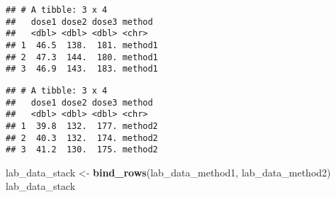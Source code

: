 \documentclass[]{book}
\newenvironment{Shaded}{\begin{snugshade}}{\end{snugshade}}
\newcommand{\CommentTok}[1]{\textcolor[rgb]{0.56,0.35,0.01}{\textit{#1}}}
\newcommand{\DataTypeTok}[1]{\textcolor[rgb]{0.13,0.29,0.53}{#1}}
\newcommand{\KeywordTok}[1]{\textcolor[rgb]{0.13,0.29,0.53}{\textbf{#1}}}
\newcommand{\NormalTok}[1]{#1}
\newcommand{\OperatorTok}[1]{\textcolor[rgb]{0.81,0.36,0.00}{\textbf{#1}}}
\newcommand{\StringTok}[1]{\textcolor[rgb]{0.31,0.60,0.02}{#1}}
\theoremstyle{definition}
\theoremstyle{definition}
\theoremstyle{definition}
\theoremstyle{remark}
\begin{document}
\begin{Shaded}
\end{Shaded}

\begin{verbatim}
## # A tibble: 3 x 4
##   dose1 dose2 dose3 method 
##   <dbl> <dbl> <dbl> <chr>  
## 1  46.5  138.  181. method1
## 2  47.3  144.  180. method1
## 3  46.9  143.  183. method1
\end{verbatim}

\begin{Shaded}
\end{Shaded}

\begin{verbatim}
## # A tibble: 3 x 4
##   dose1 dose2 dose3 method 
##   <dbl> <dbl> <dbl> <chr>  
## 1  39.8  132.  177. method2
## 2  40.3  132.  174. method2
## 3  41.2  130.  175. method2
\end{verbatim}

\begin{Shaded}
\begin{Highlighting}[]
\NormalTok{lab_data_stack <-}\StringTok{ }\KeywordTok{bind_rows}\NormalTok{(lab_data_method1, lab_data_method2)}
\NormalTok{lab_data_stack}
\end{Highlighting}
\end{Shaded}
\end{document}
